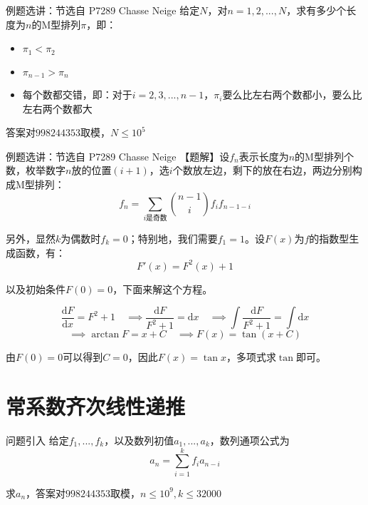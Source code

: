 \documentclass{beamer}
\begin{document}
\begin{frame}{例题选讲：节选自 P7289 Chasse Neige}
    \small
    给定$N$，对$n=1,2,...,N$，求有多少个长度为$n$的M型排列$\pi$，即：
    \begin{itemize}
        \item $\pi_1<\pi_2$
        \item $\pi_{n-1}>\pi_n$
        \item 每个数都交错，即：对于$i=2,3,...,n-1$，$\pi_i$要么比左右两个数都小，要么比左右两个数都大
    \end{itemize}

    答案对$998244353$取模，$N\leq 10^5$
\end{frame}

\begin{frame}{例题选讲：节选自 P7289 Chasse Neige}
    \small
    【题解】设$f_n$表示长度为$n$的M型排列个数\pause，枚举数字$n$放的位置$(i+1)$，选$i$个数放左边，剩下的放在右边，两边分别构成M型排列：
    \begin{equation*}
        f_n = \sum_{i \text{是奇数}} \binom{n-1}{i}f_i f_{n-1-i}
    \end{equation*}

    另外，显然$k$为偶数时$f_k=0$；特别地，我们需要$f_1=1$。\pause 设$F(x)$为$f$的指数型生成函数，有：
    \begin{equation*}
        F'(x)=F^2(x)+1
    \end{equation*}

    以及初始条件$F(0)=0$，下面来解这个方程。

    \pause
    \begin{equation*}
        \frac{\text{d} F}{\text{d}x}=F^2+1 \quad \implies \frac{\text{d} F}{F^2+1}=\text{d}x \quad \implies \int \frac{\text{d} F}{F^2+1}= \int \text{d}x
    \end{equation*}
    \pause
    \begin{equation*}
        \implies \arctan F = x+C \quad \implies F(x)=\tan(x+C)
    \end{equation*}

    由$F(0)=0$可以得到$C=0$，因此$F(x)=\tan x$，多项式求$\tan$即可。
\end{frame}


\section{常系数齐次线性递推}

\begin{frame}{问题引入}
    给定$f_1,...,f_k$，以及数列初值$a_1,...,a_k$，数列通项公式为
    \begin{equation*}
        a_n=\sum_{i=1}^k f_i a_{n-i}
    \end{equation*}

    求$a_n$，答案对$998244353$取模，$n\leq 10^9,k\leq 32000$
\end{frame}
\end{document}
